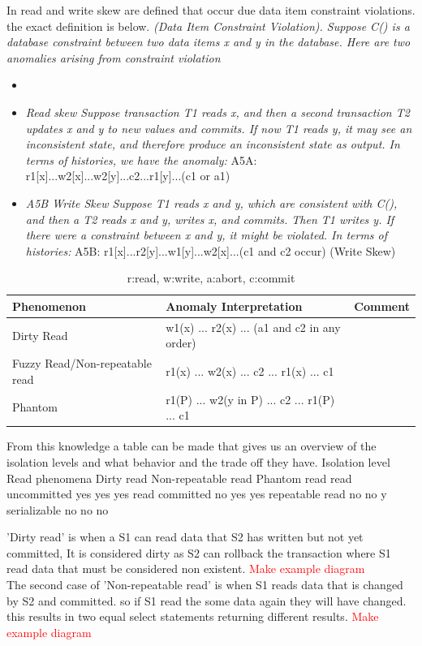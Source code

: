 \documentclass[a4paper,10pt,titlepage]{report}
\begin{document}
In \cite{Berensonetal} read and write skew are defined that occur due data item constraint violations. the exact definition is below.
\textit{(Data Item Constraint Violation). Suppose C() is a
database constraint between two data items x and y in the
database. Here are two anomalies arising from constraint
violation}

\begin{itemize}
\item 
\item \textit{Read skew Suppose transaction T1 reads x, and then a second transaction T2 updates x and y to new values and commits. If now T1 reads y, it may see an inconsistent state, and therefore produce an inconsistent state as output.
In terms of histories, we have the anomaly:  }
A5A: r1[x]...w2[x]...w2[y]...c2...r1[y]...(c1 or a1)
\item \textit{A5B Write Skew Suppose T1 reads x and y, which are
consistent with C(), and then a T2 reads x and y, writes x,
and commits. Then T1 writes y. If there were a constraint
between x and y, it might be violated. In terms of histories:}
A5B: r1[x]...r2[y]...w1[y]...w2[x]...(c1 and c2 occur)
(Write Skew)
\end{itemize}



\begin{table}[h]
\begin{tabular}{|l|l|l|}
\hline
Phenomenon & Anomaly Interpretation                           & Comment \\\hline
Dirty Read & w1(x) ... r2(x) ... (a1 and c2 in any order)     &         \\\hline
Fuzzy Read/Non-repeatable read & r1(x) ... w2(x) ... c2 ... r1(x) ... c1      &         \\\hline
Phantom    & r1(P) ... w2(y in P) ... c2 ... r1(P) ... c1 &        \\ \hline
\end{tabular}
\caption{r:read, w:write, a:abort, c:commit}
\end{table}


From this knowledge a table can be made that gives us an overview of the isolation levels and what behavior and the trade off they have.
Isolation level	Read phenomena
Dirty read	Non-repeatable read	Phantom read
read uncommitted	yes	yes	yes
read committed	no	yes	yes
repeatable read	no	no	y
serializable	no	no	no


'Dirty read' is when a S1 can read data that S2 has written but not yet committed, It is considered dirty as S2 can rollback the transaction where S1 read data that must be considered non existent. \textcolor{red}{Make example diagram}
\\
The second case of 'Non-repeatable read' is when S1 reads data that is changed by S2 and committed. so if S1 read the some data again they will have changed. this results in two equal select statements returning different results.  \textcolor{red}{Make example diagram}
\end{document}
